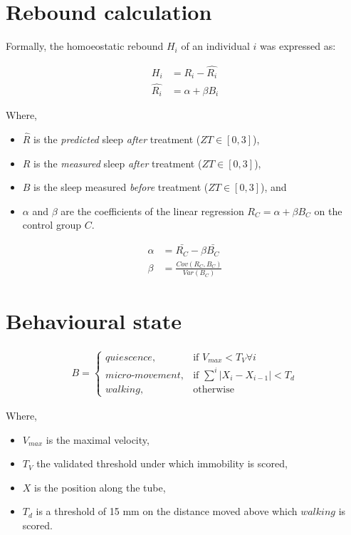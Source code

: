 \documentclass[a4paper,twoside,openright]{article}
\begin{document}
\section*{Rebound calculation}
Formally, the homoeostatic rebound $H_i$ of an individual $i$ was expressed as:

\begin{align}
H_i &=  R_i - \hat{R_i} \\
\hat{R_i} &= \alpha + \beta{} B_i
\end{align}


Where,
\begin{itemize}
	\item $\hat{R}$ is the \emph{predicted} sleep \emph{after} treatment ($ZT \in [0, 3]$),
	\item $R$ is the \emph{measured} sleep \emph{after} treatment ($ZT \in [0, 3]$),
	\item $B$ is the sleep measured \emph{before} treatment ($ZT \in [0, 3]$), and
	\item $\alpha$ and $\beta$ are the coefficients of the linear regression $R_C = \alpha + \beta{B_C}$ on the control group $C$.
\end{itemize}

\begin{align}
\alpha &=  \bar{R_C} - \beta\bar{B_C} \\
\beta &= \frac{Cov(R_C, B_C)}{Var(B_C)}
\end{align}


\section*{Behavioural state}

\begin{align}
B = 
\begin{cases}
quiescence,            & \text{if } V_{max} < T_V \forall i\\
micro\text{-}movement, & \text{if } \sum^{i}{|X_i - X_{i-1}|} < T_d\\
walking,               & \text{otherwise}
\end{cases}
\end{align}



Where,
\begin{itemize}
	\item $V_{max}$ is the maximal velocity,
	\item $T_V$ the validated threshold under which immobility is scored,
	\item $X$ is the position along the tube,
	\item $T_d$ is a threshold of 15 mm on the distance moved above which $walking$ is scored.
\end{itemize}
\end{document}
